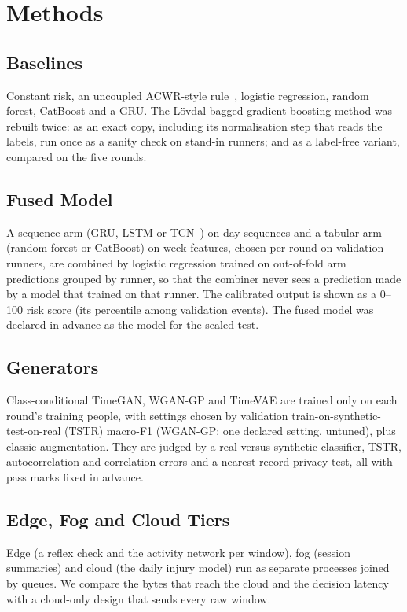 \documentclass{ieeeaccess}
\begin{document}
\section{Methods}
\subsection{Baselines}
Constant risk, an uncoupled ACWR-style rule~\cite{lolli2019}, logistic regression, random forest,
CatBoost and a GRU. The L\"ovdal bagged gradient-boosting method was rebuilt twice: as an exact
copy, including its normalisation step that reads the labels, run once as a sanity check on
stand-in runners; and as a label-free variant, compared on the five rounds.

\subsection{Fused Model}
A sequence arm (GRU, LSTM or TCN~\cite{bai2018}) on day sequences and a tabular arm (random
forest or CatBoost) on week features, chosen per round on validation runners, are combined by
logistic regression trained on out-of-fold arm predictions grouped by runner, so that the
combiner never sees a prediction made by a model that trained on that runner. The calibrated
output is shown as a 0--100 risk score (its percentile among validation events). The fused model
was declared in advance as the model for the sealed test.

\subsection{Generators}
Class-conditional TimeGAN, WGAN-GP and TimeVAE are trained only on each round's training people,
with settings chosen by validation train-on-synthetic-test-on-real (TSTR) macro-F1 (WGAN-GP: one
declared setting, untuned), plus classic augmentation. They are judged by a real-versus-synthetic
classifier, TSTR, autocorrelation and correlation errors and a nearest-record privacy test, all
with pass marks fixed in advance.

\subsection{Edge, Fog and Cloud Tiers}
Edge (a reflex check and the activity network per window), fog (session summaries) and cloud (the
daily injury model) run as separate processes joined by queues. We compare the bytes that reach
the cloud and the decision latency with a cloud-only design that sends every raw window.
\end{document}

